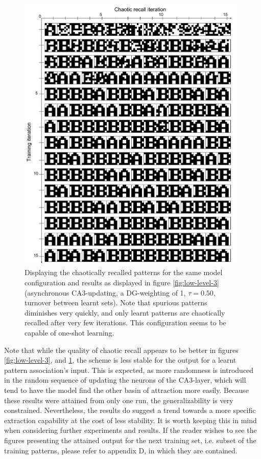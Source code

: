 \begin{figure}
    \centering
    \includegraphics[width=11cm]{fig/AB-chaotic-recall-async-tm0-dgw1-tau050}
    \caption{Displaying the chaotically recalled patterns for the same model configuration and results as displayed in figure \ref{fig:low-level-3} (asynchronous CA3-updating, a DG-weighting of 1, $\tau=0.50$, turnover between learnt sets). Note that spurious patterns diminishes very quickly, and only learnt patterns are chaotically recalled after very few iterations. This configuration seems to be capable of one-shot learning.}
    \label{fig:low-level-4}
\end{figure}

Note that while the quality of chaotic recall appears to be better in figures \ref{fig:low-level-3}, and \ref{fig:low-level-4}, the scheme is less stable for the output for a learnt pattern association's input. This is expected, as more randomness is introduced in the random sequence of updating the neurons of the CA3-layer, which will tend to have the model find the other basin of attraction more easily. Because these results were attained from only one run, the generalizability is very constrained. Nevertheless, the results do suggest a trend towards a more specific extraction capability at the cost of less stability. It is worth keeping this in mind when considering further experiments and results. If the reader wishes to see the figures presenting the attained output for the next training set, i.e. subset of the training patterns, please refer to appendix D, in which they are contained.

